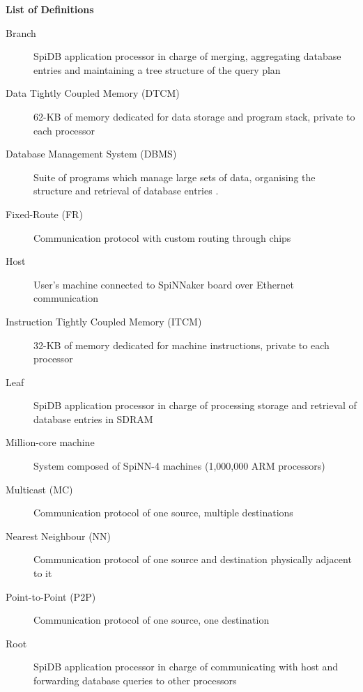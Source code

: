 \vspace*{1.2cm}
{ \huge \bfseries List of Definitions}
\vspace{7mm}

\small
\begin{description}

  \item[Branch] SpiDB application processor in charge of merging, aggregating database entries and maintaining a tree structure of the query plan

  \item[Data Tightly Coupled Memory (DTCM)] 62-KB of memory dedicated for data storage and program stack, private to each processor
  
  \item[Database Management System (DBMS)] Suite of programs which manage large sets of data, organising the structure and retrieval of database entries \cite{dbmsdef}.
   
  \item[Fixed-Route (FR)] Communication protocol with custom routing through chips   
    
  \item[Host] User's machine connected to SpiNNaker board over Ethernet communication    
    
  \item[Instruction Tightly Coupled Memory (ITCM)] 32-KB of memory dedicated for machine instructions, private to each processor    
    
  \item[Leaf] SpiDB application processor in charge of processing storage and retrieval of database entries in SDRAM    
    
  \item[Million-core machine] System composed of  SpiNN-4 machines (1,000,000 ARM processors)   
  
  \item[Multicast (MC)] Communication protocol of one source, multiple destinations    

  \item[Nearest Neighbour (NN)] Communication protocol of one source and destination physically adjacent to it

  \item[Point-to-Point (P2P)] Communication protocol of one source, one destination    
  
  \item[Root] SpiDB application processor in charge of communicating with host and forwarding database queries to other processors
  

\end{description}
